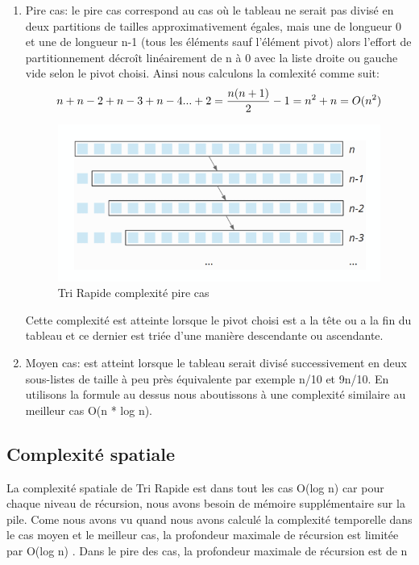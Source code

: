 \begin{enumerate}
   \item Pire cas: le pire cas correspond au cas où le tableau ne serait pas divisé en deux partitions de tailles approximativement égales, mais une de longueur 0 et une de longueur n-1 (tous les éléments sauf l'élément pivot) alors l'effort de partitionnement décroît linéairement de n à 0 avec la liste droite ou gauche vide selon le pivot choisi.
   Ainsi nous calculons la comlexité comme suit: 
   \[
   n+n-2+n-3+n-4...+2 =\frac{n(n+1)}{2}-1 \\
   = n^2 + n \\
   = O(n^2) \\
   \]
   \begin{figure} [H]
       \centering
       \includegraphics[scale=0.45]{ressources/Quicksort_worst_case_time_complexity-600x292.png}
       \caption{Tri Rapide complexité pire cas}
       \label{fig:rapidel}
   \end{figure}
    Cette complexité est atteinte lorsque le pivot choisi est a la tête ou a la fin du tableau et ce dernier est triée d'une manière descendante ou ascendante.
   \item Moyen cas: est atteint lorsque le tableau serait divisé successivement
en deux sous-listes de taille à peu près équivalente par exemple n/10 et 9n/10.
En utilisons la formule au dessus nous aboutissons à une complexité similaire au meilleur cas O(n * log n).
\end{enumerate}

  


\subsection{Complexité spatiale}
La complexité spatiale de Tri Rapide est dans tout les cas O(log n)
car pour chaque niveau de récursion, nous avons besoin de mémoire supplémentaire sur la pile. Come nous avons vu quand nous avons calculé la complexité temporelle dans le cas moyen et le meilleur cas, la profondeur maximale de récursion est limitée par O(log n) .
Dans le pire des cas, la profondeur maximale de récursion est de n
